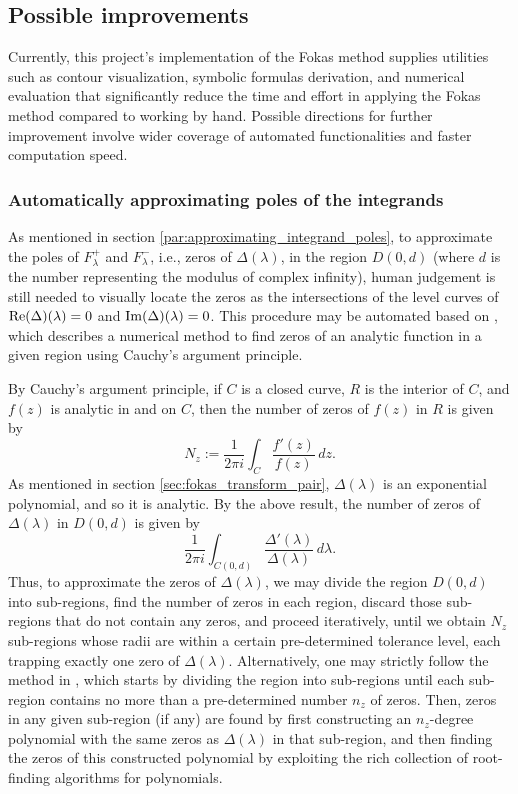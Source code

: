 \documentclass[12pt, oneside, a4paper]{article}
\begin{document}
\subsection{Possible improvements}

Currently, this project's implementation of the Fokas method \cite{Xiao} supplies utilities such as contour visualization, symbolic formulas derivation, and numerical evaluation that significantly reduce the time and effort in applying the Fokas method compared to working by hand. Possible directions for further improvement involve wider coverage of automated functionalities and faster computation speed.

\subsubsection{Automatically approximating poles of the integrands}

As mentioned in section \ref{par:approximating_integrand_poles}, to approximate the poles of $F^+_\lambda$ and $F^-_\lambda$, i.e., zeros of $\Delta(\lambda)$, in the region $D(0,d)$ (where $d$ is the number representing the modulus of complex infinity), human judgement is still needed to visually locate the zeros as the intersections of the level curves of $\mathrm{Re}(\Delta)(\lambda)=0$ and $\mathrm{Im}(\Delta)(\lambda)=0$. This procedure may be automated based on \cite{Delves1967}, which describes a numerical method to find zeros of an analytic function in a given region using Cauchy's argument principle.

By Cauchy's argument principle, if $C$ is a closed curve, $R$ is the interior of $C$, and $f(z)$ is analytic in and on $C$, then the number of zeros of $f(z)$ in $R$ is given by
\[N_z := \frac{1}{2\pi i}\int_C \frac{f'(z)}{f(z)}\,dz.\]
As mentioned in section \ref{sec:fokas_transform_pair}, $\Delta(\lambda)$ is an exponential polynomial, and so it is analytic. By the above result, the number of zeros of $\Delta(\lambda)$ in $D(0,d)$ is given by
\[\frac{1}{2\pi i}\int_{C(0,d)} \frac{\Delta'(\lambda)}{\Delta(\lambda)}\,d\lambda.\]
Thus, to approximate the zeros of $\Delta(\lambda)$, we may divide the region $D(0,d)$ into sub-regions, find the number of zeros in each region, discard those sub-regions that do not contain any zeros, and proceed iteratively, until we obtain $N_z$ sub-regions whose radii are within a certain pre-determined tolerance level, each trapping exactly one zero of $\Delta(\lambda)$. Alternatively, one may strictly follow the method in \cite{Delves1967}, which starts by dividing the region into sub-regions until each sub-region contains no more than a pre-determined number $n_z$ of zeros. Then, zeros in any given sub-region (if any) are found by first constructing an $n_z$-degree polynomial with the same zeros as $\Delta(\lambda)$ in that sub-region, and then finding the zeros of this constructed polynomial by exploiting the rich collection of root-finding algorithms for polynomials.
\end{document}
